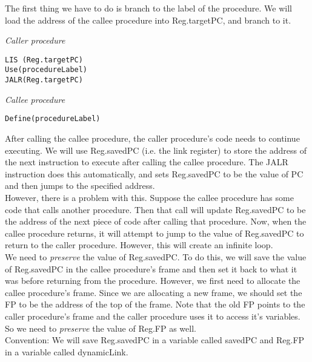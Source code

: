 \documentclass[12pt, letterpaper]{article}
\begin{document}
The first thing we have to do is branch to the label of the procedure. We will load the address of the callee procedure into Reg.targetPC, and branch to it.\\

\begin{minipage}[t]{0.5\textwidth}
\emph{Caller procedure}
\begin{verbatim}
LIS (Reg.targetPC)
Use(procedureLabel)
JALR(Reg.targetPC)
\end{verbatim}
\end{minipage}
\begin{minipage}[t]{0.5\textwidth}
\emph{Callee procedure}
\begin{verbatim}
Define(procedureLabel)
\end{verbatim}
\end{minipage}

\vspace{7mm}

After calling the callee procedure, the caller procedure's code needs to continue executing. 
We will use Reg.savedPC (i.e. the link register) to store the address of the next instruction to execute after calling the callee procedure. The JALR instruction does this automatically, and sets Reg.savedPC to be the value of PC and then jumps to the specified address.\\

However, there is a problem with this. Suppose the callee procedure has some code that calls another procedure. Then that call will update Reg.savedPC to be the address of the next piece of code after calling that procedure. Now, when the callee procedure returns, it will attempt to jump to the value of Reg.savedPC to return to the caller procedure. However, this will create an infinite loop.\\

We need to \emph{preserve} the value of Reg.savedPC. To do this, we will save the value of Reg.savedPC in the callee procedure's frame and then set it back to what it was before returning from the procedure. However, we first need to allocate the callee procedure's frame. Since we are allocating a new frame, we should set the FP to be the address of the top of the frame. Note that the old FP points to the caller procedure's frame and the caller procedure uses it to access it's variables. So we need to \emph{preserve} the value of Reg.FP as well.\\

Convention: We will save Reg.savedPC in a variable called savedPC and Reg.FP in a variable called dynamicLink.\\
\end{document}

